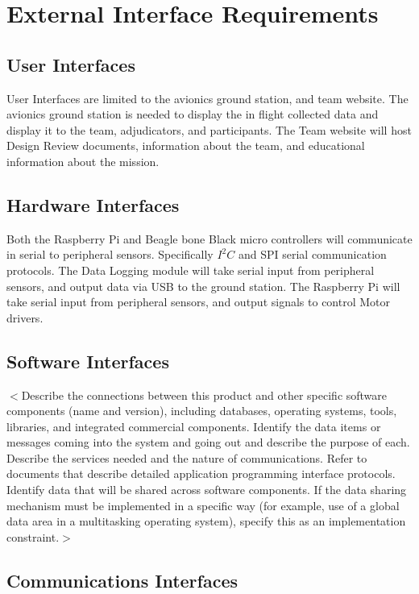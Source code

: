 \documentclass{scrreprt}
\begin{document}
\chapter{External Interface Requirements}

\section{User Interfaces}
User Interfaces are limited to the avionics ground station, and team website. The avionics ground station is needed to display the in flight collected data and display it to the team, adjudicators, and participants. The Team website will host Design Review documents, information about the team, and educational information about the mission.

\section{Hardware Interfaces}
Both the Raspberry Pi and Beagle bone Black micro controllers will communicate in serial to peripheral sensors. Specifically $I^2 C$ and SPI serial communication protocols. The Data Logging module will take serial input from peripheral sensors, and output data via USB to the ground station. The Raspberry Pi will take serial input from peripheral sensors, and output signals to control Motor drivers.

\section{Software Interfaces}
$<$Describe the connections between this product and other specific software 
components (name and version), including databases, operating systems, tools, 
libraries, and integrated commercial components. Identify the data items or 
messages coming into the system and going out and describe the purpose of each.  
Describe the services needed and the nature of communications. Refer to 
documents that describe detailed application programming interface protocols.  
Identify data that will be shared across software components. If the data 
sharing mechanism must be implemented in a specific way (for example, use of a 
global data area in a multitasking operating system), specify this as an 
implementation constraint.$>$

\section{Communications Interfaces}
\end{document}
